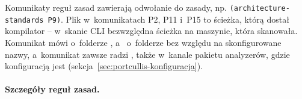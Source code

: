 Komunikaty reguł zasad zawierają odwołanie do zasady, np. \texttt{(architecture-standards P9)}.
Plik w~komunikatach P2, P11 i~P15 to ścieżka, którą dostał kompilator -- w~skanie CLI
bezwzględna ścieżka na maszynie, która skanowała. Komunikat
 mówi o~folderze ,
a~ o~folderze
 bez względu na skonfigurowane nazwy, a~komunikat
 zawsze radzi , także
w~kanale pakietu analyzerów, gdzie konfiguracją jest 
(sekcja~\ref{sec:portcullis-konfiguracja}).

\paragraph{Szczegóły reguł zasad.}
